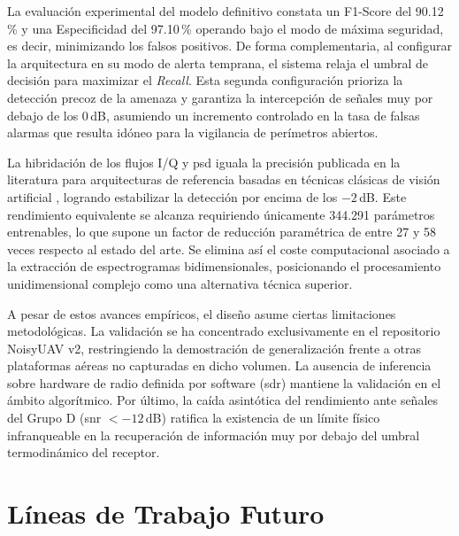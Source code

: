 La evaluación experimental del modelo definitivo constata un F1-Score del 90.12\,\% y una Especificidad del 97.10\,\% operando bajo el modo de máxima seguridad, es decir, minimizando los falsos positivos. De forma complementaria, al configurar la arquitectura en su modo de alerta temprana, el sistema relaja el umbral de decisión para maximizar el \textit{Recall}. Esta segunda configuración prioriza la detección precoz de la amenaza y garantiza la intercepción de señales muy por debajo de los 0\,dB, asumiendo un incremento controlado en la tasa de falsas alarmas que resulta idóneo para la vigilancia de perímetros abiertos.

La hibridación de los flujos I/Q y \gls{psd} iguala la precisión publicada en la literatura para arquitecturas de referencia basadas en técnicas clásicas de visión artificial \cite{gluge_robust_2024}, logrando estabilizar la detección por encima de los $-2$\,dB. Este rendimiento equivalente se alcanza requiriendo únicamente 344.291 parámetros entrenables, lo que supone un factor de reducción paramétrica de entre 27 y 58 veces respecto al estado del arte. Se elimina así el coste computacional asociado a la extracción de espectrogramas bidimensionales, posicionando el procesamiento unidimensional complejo como una alternativa técnica superior.

A pesar de estos avances empíricos, el diseño asume ciertas limitaciones metodológicas. La validación se ha concentrado exclusivamente en el repositorio NoisyUAV v2, restringiendo la demostración de generalización frente a otras plataformas aéreas no capturadas en dicho volumen. La ausencia de inferencia sobre hardware de radio definida por software (\gls{sdr}) mantiene la validación en el ámbito algorítmico. Por último, la caída asintótica del rendimiento ante señales del Grupo D (\gls{snr} $< -12$\,dB) ratifica la existencia de un límite físico infranqueable en la recuperación de información muy por debajo del umbral termodinámico del receptor.

\section{Líneas de Trabajo Futuro}
\label{sec:trabajo_futuro}

